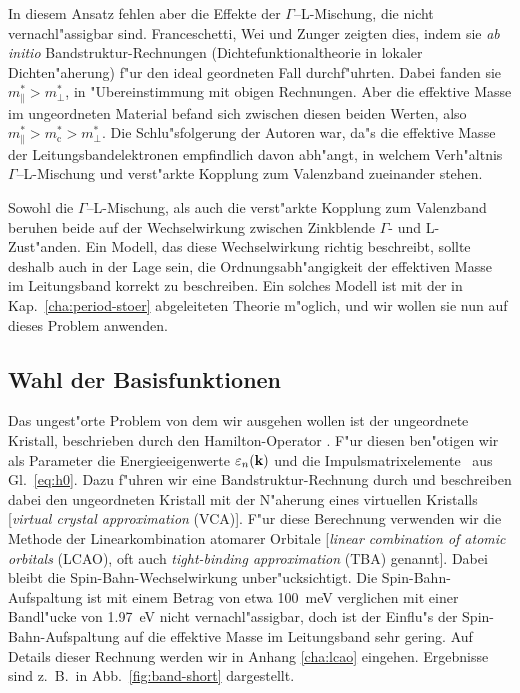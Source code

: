 In diesem Ansatz fehlen aber die Effekte der $\Gamma$--L-Mischung, die
nicht vernachl"assigbar sind. Franceschetti, Wei und Zunger \cite{fwz:95}
zeigten dies, indem sie \emph{ab initio} Bandstruktur-Rechnungen
(Dichtefunktionaltheorie in lokaler Dichten"aherung) f"ur den ideal
geordneten Fall durchf"uhrten. Dabei fanden sie $m^{\ast}_{\parallel} >
m^{\ast}_{\perp}$, in "Ubereinstimmung mit obigen Rechnungen. Aber die
effektive Masse im ungeordneten Material befand sich zwischen diesen beiden
Werten, also $m^{\ast}_{\parallel} > m^{\ast}_{\text{c}} > m^{\ast}_{\perp}$.
Die Schlu"sfolgerung der Autoren war, da"s die effektive Masse der
Leitungsbandelektronen empfindlich davon abh"angt, in welchem Verh"altnis
$\Gamma$--L-Mischung und verst"arkte Kopplung zum Valenzband zueinander
stehen.

Sowohl die $\Gamma$--L-Mischung, als auch die verst"arkte Kopplung zum
Valenzband beruhen beide auf der Wechselwirkung zwischen Zinkblende
$\Gamma$- und L-Zust"anden. Ein Modell, das diese Wechselwirkung richtig
beschreibt, sollte deshalb auch in der Lage sein, die Ordnungsabh"angigkeit
der effektiven Masse im Leitungsband korrekt zu beschreiben. Ein solches
Modell ist mit der in Kap.~\ref{cha:period-stoer} abgeleiteten Theorie
m"oglich, und wir wollen sie nun auf dieses Problem anwenden.


\subsection{Wahl der Basisfunktionen}
\label{sec:basiswahl}

Das ungest"orte Problem von dem wir ausgehen wollen ist der ungeordnete
Kristall, beschrieben durch den Hamilton-Operator . F"ur diesen
ben"otigen wir als Parameter die Energieeigenwerte $\varepsilon_{n}(\mathbf{k})$ und
die Impulsmatrixelemente \pnnK\ aus Gl.~\eqref{eq:h0}. Dazu f"uhren wir eine
Bandstruktur-Rechnung durch und beschreiben dabei den ungeordneten Kristall
mit der N"aherung eines virtuellen Kristalls [\emph{virtual crystal
  approximation} (VCA)]. F"ur diese Berechnung verwenden wir die Methode der
Linearkombination atomarer Orbitale [\emph{linear combination of atomic
  orbitals} (LCAO), oft auch \emph{tight-binding approximation} (TBA)
genannt]. Dabei bleibt die Spin-Bahn-Wechselwirkung unber"ucksichtigt. Die
Spin-Bahn-Aufspaltung ist mit einem Betrag von etwa 100~meV verglichen mit
einer Bandl"ucke von 1.97~eV nicht vernachl"assigbar, doch ist der Einflu"s
der Spin-Bahn-Aufspaltung auf die effektive Masse im Leitungsband sehr gering.
Auf Details dieser Rechnung werden wir in Anhang \ref{cha:lcao} eingehen.
Ergebnisse sind z.~B.\ in Abb.~\ref{fig:band-short} dargestellt.

